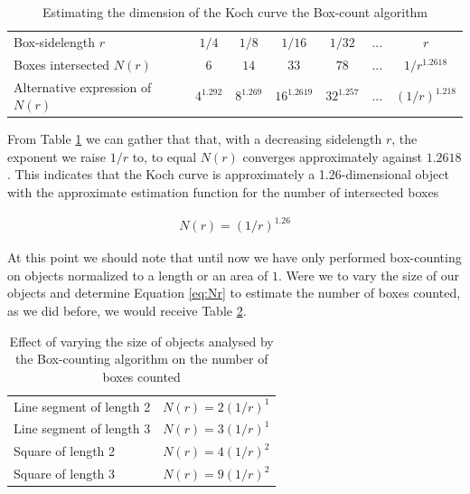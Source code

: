 \documentclass{article}[12pt]
\begin{document}
\begin{table}[!ht]
\begin{tabular}{p{3cm}cccccc}
&&&&&&\\
\hline
\hline
Box-sidelength $r$ &  $1/4$ & $1/8$ & $1/16$ &  $1/32$ & $...$ & $r$\\
\hline
Boxes  \newline intersected $N(r)$  & $6$ & $14$ & $33$ & $78$ & $...$ & $1/r^{1.2618}$\\
Alternative \newline expression of $N(r)$ & $ 4^{1.292}$ & $8^{1.269}$  & $16^{1.2619}$  & $32^{1.257}$ & $...$ & $(1/r)^{1.218}$ \\
\hline
\hline
\end{tabular}
\caption{Estimating the dimension of the Koch curve the Box-count algorithm}
\label{table:box_koch}
\end{table}

From Table \ref{table:box_koch} we can gather that that, with a decreasing sidelength $r$, the exponent we raise $1/r$ to, to equal $N(r)$ converges approximately against $1.2618$. This indicates that the Koch curve is approximately a 1.26-dimensional object with the approximate estimation function for the number of intersected boxes

\begin{align}
N(r) = (1/r)^{1.26}
\end{align}

At this point we should note that until now we have only performed box-counting on objects normalized to a length or an area of $1$. Were we to vary the size of our objects and determine Equation \ref{eq:Nr} to estimate the number of boxes counted, as we did before, we would receive Table \ref{table:box_const}.


\begin{table}[!ht]
\begin{tabular}{p{5cm}c}
&\\
\hline
\hline
Line segment of length 2 & $N(r)=2(1/r)^1$ \\[2.5ex]
\hline
Line segment of length 3 & $N(r)=3(1/r)^1$ \\[2.5ex]
\hline
Square of length 2 & $N(r)=4(1/r)^2$ \\[2.5ex]
\hline
Square of length 3 & $N(r)=9(1/r)^2$ \\[2.5ex]
\hline
\hline
\end{tabular}
\caption{Effect of varying the size of objects analysed by the Box-counting algorithm on the number of boxes counted}
\label{table:box_const}
\end{table}
\end{document}
